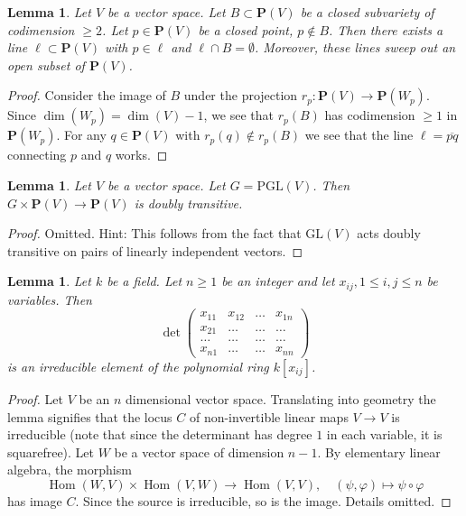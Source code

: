 \documentclass{stacks-project}
\theoremstyle{plain}
\newtheorem{lemma}[subsection]{Lemma}
\theoremstyle{definition}
\theoremstyle{remark}
\numberwithin{equation}{subsection}
\def\Hom{\mathop{\mathrm{Hom}}\nolimits}
\begin{document}
\begin{lemma}
\label{lemma-find-lines}
Let $V$ be a vector space. Let $B \subset \mathbf{P}(V)$
be a closed subvariety of codimension $\geq 2$.
Let $p \in \mathbf{P}(V)$ be a closed point, $p \not \in B$.
Then there exists a line $\ell \subset \mathbf{P}(V)$
with $p \in \ell$ and $\ell \cap B = \emptyset$. Moreover, these lines
sweep out an open subset of $\mathbf{P}(V)$.
\end{lemma}

\begin{proof}
Consider the image of $B$ under the projection
$r_p : \mathbf{P}(V) \to \mathbf{P}(W_p)$.
Since $\dim(W_p) = \dim(V) - 1$, we see that $r_p(B)$
has codimension $\geq 1$ in $\mathbf{P}(W_p)$.
For any $q \in \mathbf{P}(V)$ with $r_p(q) \not \in r_p(B)$
we see that the line $\ell = \overline{pq}$ connecting $p$ and $q$ works.
\end{proof}

\begin{lemma}
\label{lemma-doubly-transitive}
Let $V$ be a vector space. Let $G = \text{PGL}(V)$.
Then $G \times \mathbf{P}(V) \to \mathbf{P}(V)$ is
doubly transitive.
\end{lemma}

\begin{proof}
Omitted. Hint: This follows from the fact that $\text{GL}(V)$ acts doubly
transitive on pairs of linearly independent vectors.
\end{proof}

\begin{lemma}
\label{lemma-determinant}
Let $k$ be a field. Let $n \geq 1$ be an integer and let
$x_{ij}, 1 \leq i, j \leq n$ be variables. Then
$$
\det
\left(
\begin{matrix}
x_{11} & x_{12} & \ldots & x_{1n} \\
x_{21} & \ldots & \ldots & \ldots \\
\ldots & \ldots & \ldots & \ldots \\
x_{n1} & \ldots & \ldots & x_{nn}
\end{matrix}
\right)
$$
is an irreducible element of the polynomial ring $k[x_{ij}]$.
\end{lemma}

\begin{proof}
Let $V$ be an $n$ dimensional vector space. Translating into geometry
the lemma signifies that the locus $C$ of non-invertible linear maps
$V \to V$ is irreducible (note that since the determinant has degree
$1$ in each variable, it is squarefree). Let $W$ be a vector space of
dimension $n - 1$. By elementary linear algebra, the morphism
$$
\Hom(W, V) \times \Hom(V, W) \longrightarrow \Hom(V, V),\quad
(\psi, \varphi) \longmapsto \psi \circ \varphi
$$
has image $C$. Since the source is irreducible, so is the image.
Details omitted.
\end{proof}
\end{document}
